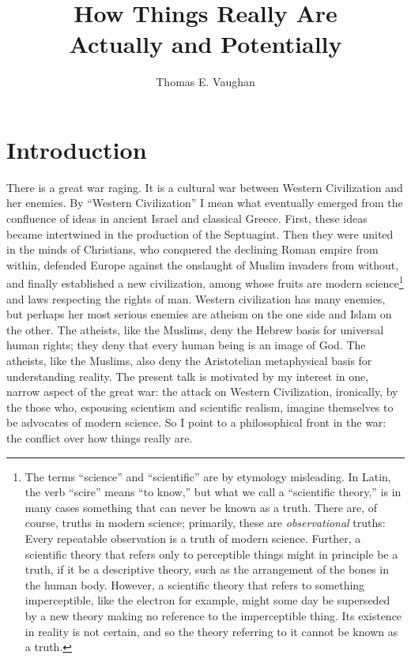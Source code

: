 \documentclass{article}
\title{How Things Really Are\\{\Large Actually and Potentially}}
\author{Thomas E. Vaughan}
\begin{document}
\maketitle

\section{Introduction}

There is a great war raging.  It is a cultural war between Western Civilization
and her enemies.  By ``Western Civilization'' I mean what eventually emerged
from the confluence of ideas in ancient Israel and classical Greece.  First,
these ideas became intertwined in the production of the Septuagint.  Then they
were united in the minds of Christians, who conquered the declining Roman
empire from within, defended Europe against the onslaught of Muslim invaders
from without, and finally established a new civilization, among whose fruits
are modern science\footnote{%
   The terms ``science'' and ``scientific'' are by etymology misleading.  In
   Latin, the verb ``scire'' means ``to know,'' but what we call a ``scientific
   theory,'' is in many cases something that can never be known as a truth.
   There are, of course, truths in modern science; primarily, these are
   \emph{observational} truths: Every repeatable observation is a truth of
   modern science.  Further, a scientific theory that refers only to
   perceptible things might in principle be a truth, if it be a descriptive
   theory, such as the arrangement of the bones in the human body.  However, a
   scientific theory that refers to something imperceptible, like the electron
   for example, might some day be superseded by a new theory making no
   reference to the imperceptible thing.  Its existence in reality is not
   certain, and so the theory referring to it cannot be known as a truth.%
}
and laws respecting the rights of man.  Western civilization has many enemies,
but perhaps her most serious enemies are atheism on the one side and Islam on
the other.  The atheists, like the Muslims, deny the Hebrew basis for universal
human rights; they deny that every human being is an image of God.  The
atheists, like the Muslims, also deny the Aristotelian metaphysical basis for
understanding reality.  The present talk is motivated by my interest in one,
narrow aspect of the great war: the attack on Western Civilization, ironically,
by the those who, espousing scientism and scientific realism, imagine
themselves to be advocates of modern science.  So I point to a philosophical
front in the war: the conflict over how things really are.
\end{document}
